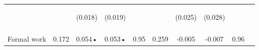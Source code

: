 \begin{table}[h!]
{\begin{tabular}{lccccccccc}
 & \begin{footnotesize}\end{footnotesize} & \begin{footnotesize}(0.018)\end{footnotesize} & \begin{footnotesize}(0.019)\end{footnotesize} & \begin{footnotesize}\end{footnotesize} & \begin{footnotesize}\end{footnotesize} & \begin{footnotesize}(0.025)\end{footnotesize} & \begin{footnotesize}(0.028)\end{footnotesize} & \begin{footnotesize}\end{footnotesize} & \begin{footnotesize}\end{footnotesize}\\
 & \begin{footnotesize}\end{footnotesize} & \begin{footnotesize}[0.215]\end{footnotesize} & \begin{footnotesize}[0.004]\end{footnotesize} & \begin{footnotesize}\end{footnotesize} & \begin{footnotesize}\end{footnotesize} & \begin{footnotesize}[0.411]\end{footnotesize} & \begin{footnotesize}[1.000]\end{footnotesize} & \begin{footnotesize}\end{footnotesize} & \begin{footnotesize}\end{footnotesize}\\
\noalign{\smallskip}Formal work & 0.172 & 0.054• & 0.053• & 0.95 & 0.259 & -0.005 & -0.007 & 0.96 & \\

\end{tabular}}
\end{table}
